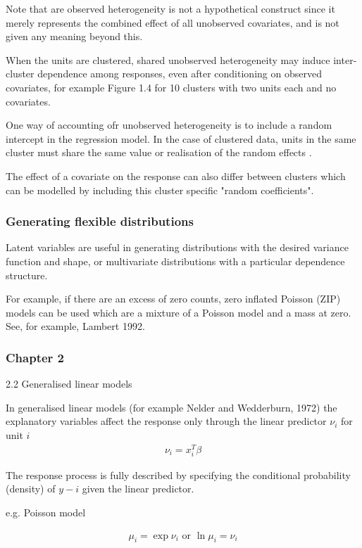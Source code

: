 \documentclass{amsart}
\begin{document}
Note that are observed heterogeneity is not a hypothetical construct since it merely represents the combined effect of all unobserved covariates, and is not given any meaning beyond this.

When the units are clustered, shared unobserved heterogeneity may induce inter-cluster dependence among responses, even after conditioning on observed covariates, for example Figure 1.4 for 10 clusters with two units each and no covariates.

One way of accounting ofr unobserved heterogeneity is to include a random intercept in the regression model. In the case of clustered data, units in the same cluster must share the same value or realisation of the random effects .

The effect of a covariate on the response can also differ between clusters which can be modelled by including this cluster specific "random coefficients".

\subsubsection{Generating flexible distributions}

 Latent variables are useful in generating distributions with the desired variance function and shape, or multivariate distributions with a particular dependence structure.
 
 For example, if there are an excess of zero counts, zero inflated Poisson (ZIP) models can be used which are a mixture of a Poisson model and a mass at zero. See, for example, Lambert 1992.
 
\subsubsection{Chapter 2}
 
2.2 Generalised linear models
 
In generalised linear models (for example Nelder and Wedderburn, 1972) the explanatory variables affect the response only through the linear predictor $\nu_i$ for unit $i$
\begin{align*}
	\nu_i = x_i ^T \beta
\end{align*}

The response process is fully described by specifying the conditional probability 
(density) of $y-i$ given the linear predictor.

e.g. Poisson model

\begin{align*}
	\mu_i = \exp{\nu_i}\text{ or }\ln{\mu_i} = \nu_i
\end{align*}
\end{document}
